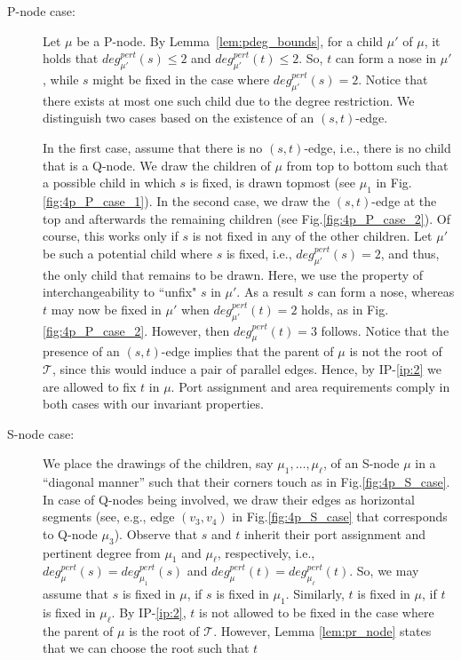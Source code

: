 \documentclass[a4paper,twoside,11pt]{article}
\newcommand{\pdeg}[2]{\textit{deg}^{\textit{pert}}_{#1}(#2)}
\newcommand{\IPFix}{IP-\ref{ip:2}\xspace}
\begin{document}
\begin{description}
\item[P-node case:] Let $\mu$ be a P-node. By Lemma~\ref{lem:pdeg_bounds},
for a child $\mu'$ of $\mu$, it holds that $\pdeg{\mu'}{s} \leq 2$
and $\pdeg{\mu'}{t} \leq 2$. So, $t$ can form a nose in $\mu'$,
while $s$ might be fixed in the case where $\pdeg{\mu'}{s} = 2$.
Notice that there exists at most one such child due to the degree
restriction. We distinguish two cases based on the existence of an
$(s,t)$-edge.

In the first case, assume that there is no $(s,t)$-edge, i.e., there
is no child that is a Q-node. We draw the children of $\mu$ from top
to bottom such that a possible child in which $s$ is fixed, is drawn
topmost (see $\mu_1$ in Fig.\ref{fig:4p_P_case_1}). In the second
case, we draw the $(s,t)$-edge at the top and afterwards the
remaining children (see Fig.\ref{fig:4p_P_case_2}). Of course, this
works only if $s$ is not fixed in any of the other children. Let
$\mu'$ be such a potential child where $s$ is fixed, i.e.,
$\pdeg{\mu'}{s} = 2$, and thus, the only child that remains to be
drawn. Here, we use the property of interchangeability to ``unfix"
$s$ in $\mu'$. As a result $s$ can form a nose, whereas $t$ may now
be fixed in $\mu'$ when $\pdeg{\mu'}{t} = 2$ holds, as in
Fig.\ref{fig:4p_P_case_2}. However, then $\pdeg{\mu}{t} = 3$
follows. Notice that the presence of an $(s,t)$-edge implies that
the parent of $\mu$ is not the root of $\mathcal{T}$, since this
would induce a pair of parallel edges. Hence, by \IPFix we are
allowed to fix $t$ in $\mu$. Port assignment and area requirements
comply in both cases with our invariant properties.
\item[S-node case:] We place the drawings of the children,
say $\mu_1, \ldots, \mu_\ell$, of an S-node $\mu$ in a ``diagonal
manner'' such that their corners touch as in
Fig.\ref{fig:4p_S_case}. In case of Q-nodes being involved, we draw
their edges as horizontal segments (see, e.g., edge $(v_3,v_4)$ in
Fig.\ref{fig:4p_S_case} that corresponds to Q-node $\mu_3$). Observe
that $s$ and $t$ inherit their port assignment and pertinent degree
from $\mu_1$ and $\mu_\ell$, respectively, i.e., $\pdeg{\mu}{s} =
\pdeg{\mu_1}{s}$ and $\pdeg{\mu}{t} = \pdeg{\mu_\ell}{t}$. So, we
may assume that $s$ is fixed in $\mu$, if $s$ is fixed in $\mu_1$.
Similarly, $t$ is fixed in $\mu$, if $t$ is fixed in $\mu_\ell$. By
\IPFix, $t$ is not allowed to be fixed in the case where the parent
of $\mu$ is the root of $\mathcal{T}$. However, Lemma
\ref{lem:pr_node} states that we can choose the root such that $t$

\end{description}
\end{document}
